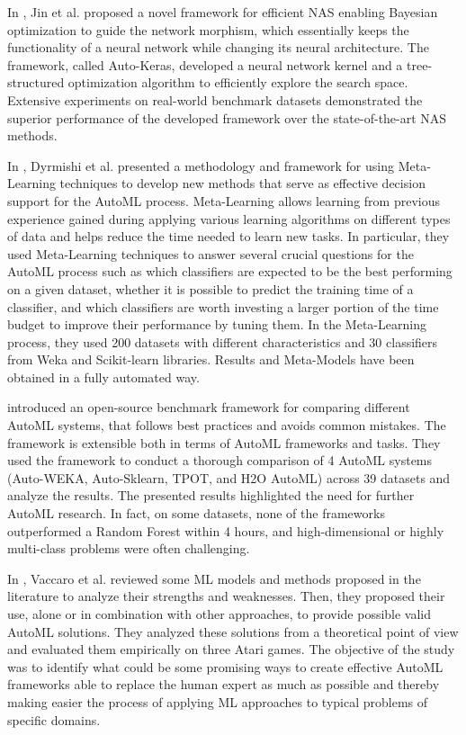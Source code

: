 In \cite{Jin2019}, Jin et al. proposed a novel framework for efficient NAS enabling Bayesian optimization to guide the network morphism, which essentially keeps the functionality of a neural network while changing its neural architecture.
The framework, called Auto-Keras, developed a neural network kernel and a tree-structured optimization algorithm to efficiently explore the search space.
Extensive experiments on real-world benchmark datasets demonstrated the superior performance of the developed framework over the state-of-the-art NAS methods.

In \cite{8955514}, Dyrmishi et al. presented a methodology and framework for using Meta-Learning techniques to develop new methods that serve as effective decision support for the AutoML process.
Meta-Learning allows learning from previous experience gained during applying various learning algorithms on different types of data and helps reduce the time needed to learn new tasks.
In particular, they used Meta-Learning techniques to answer several crucial questions for the AutoML process such as which classifiers are expected to be the best performing on a given dataset, whether it is possible to predict the training time of a classifier, and which classifiers are worth investing a larger portion of the time budget to improve their performance by tuning them.
In the Meta-Learning process, they used 200 datasets with different characteristics and 30 classifiers from Weka and Scikit-learn libraries.
Results and Meta-Models have been obtained in a fully automated way.

\cite{Gijsbers2019} introduced an open-source benchmark framework for comparing different AutoML systems, that follows best practices and avoids common mistakes.
The framework is extensible both in terms of AutoML frameworks and tasks.
They used the framework to conduct a thorough comparison of 4 AutoML systems (Auto-WEKA, Auto-Sklearn, TPOT, and H2O AutoML) across 39 datasets and analyze the results.
The presented results highlighted the need for further AutoML research.
In fact, on some datasets, none of the frameworks outperformed a Random Forest within 4 hours, and high-dimensional or highly multi-class problems were often challenging.

In \cite{computers10010011}, Vaccaro et al. reviewed some ML models and methods proposed in the literature to analyze their strengths and weaknesses.
Then, they proposed their use, alone or in combination with other approaches, to provide possible valid AutoML solutions.
They analyzed these solutions from a theoretical point of view and evaluated them empirically on three Atari games.
The objective of the study was to identify what could be some promising ways to create effective AutoML frameworks able to replace the human expert as much as possible and thereby making easier the process of applying ML approaches to typical problems of specific domains.

